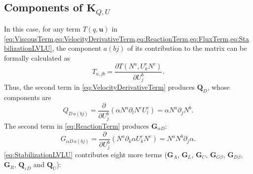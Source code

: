 \subsection{Components of $\mathbf{K}_{Q,U}$} \label{sec:KQUComponents}
In this case, for any term $T(q, \boldsymbol{u})$ in \cref{eq:ViscousTerm,eq:VelocityDerivativeTerm,eq:ReactionTerm,eq:FluxTerm,eq:StabilizationLVLU}, the component $a(bj)$ of its contribution to the matrix can be formally calculated as
\begin{equation} \label{eq:GenericMatrixQU}
  T_{a, jb} = \frac{\partial T(N^a, U_k^c N^c)}{\partial U_j^b}.
\end{equation}
Thus, the second term in \cref{eq:VelocityDerivativeTerm} produces $\mathbf{Q}_D$, whose components are
\begin{equation} \label{eq:QComponents}
  Q_{D\, a(bj)} = \frac{\partial }{\partial U_j^b} \left( \alpha N^a \partial_l N^c U_l^c \right) = \alpha N^a \partial_j N^b.
\end{equation}
The second term in \cref{eq:ReactionTerm} produces $\mathbf{G}_{\alpha D}$:
\begin{equation} \label{eq:GAlphaComponents}
  G_{\alpha D\, a(bj)} = \frac{\partial }{\partial U_j^b} \left( N^a \partial_k \alpha U_k^c N^c \right) = N^a N^b \partial_j \alpha.
\end{equation}
\cref{eq:StabilizationLVLU} contributes eight more terms ($\mathbf{G}_A$, $\mathbf{G}_L$, $\mathbf{G}_C$, $\mathbf{G}_{G \beta}$, $\mathbf{G}_{D \beta}$, $\mathbf{G}_{R}$, $\mathbf{Q}_{\varepsilon D}$ and $\mathbf{Q}_U$):

